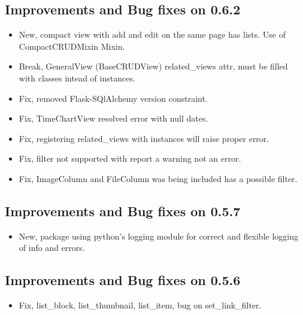 \documentclass[letterpaper,10pt,english]{sphinxmanual}
\begin{document}
\subsection{Improvements and Bug fixes on 0.6.2}
\label{versions:improvements-and-bug-fixes-on-0-6-2}\begin{itemize}
\item {} 
New, compact view with add and edit on the same page has lists. Use of CompactCRUDMixin Mixin.

\item {} 
Break, GeneralView (BaseCRUDView) related\_views attr, must be filled with classes intead of instances.

\item {} 
Fix, removed Flask-SQlAlchemy version constraint.

\item {} 
Fix, TimeChartView resolved error with null dates.

\item {} 
Fix, registering related\_views with instances will raise proper error.

\item {} 
Fix, filter not supported with report a warning not an error.

\item {} 
Fix, ImageColumn and FileColumn was being included has a possible filter.

\end{itemize}


\subsection{Improvements and Bug fixes on 0.5.7}
\label{versions:improvements-and-bug-fixes-on-0-5-7}\begin{itemize}
\item {} 
New, package using python's logging module for correct and flexible logging of info and errors.

\end{itemize}


\subsection{Improvements and Bug fixes on 0.5.6}
\label{versions:improvements-and-bug-fixes-on-0-5-6}\begin{itemize}
\item {} 
Fix, list\_block, list\_thumbnail, list\_item, bug on set\_link\_filter.

\end{itemize}
\end{document}
